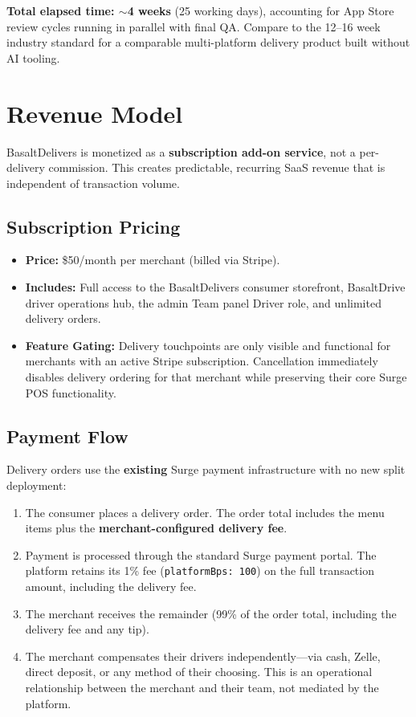 \documentclass[11pt, letterpaper]{article}
\begin{document}
\begin{insightbox}
\textbf{Total elapsed time: $\sim$4 weeks} (25 working days), accounting for App Store review cycles running in parallel with final QA. Compare to the 12--16 week industry standard for a comparable multi-platform delivery product built without AI tooling.
\end{insightbox}

\section{Revenue Model}

BasaltDelivers is monetized as a \textbf{subscription add-on service}, not a per-delivery commission. This creates predictable, recurring SaaS revenue that is independent of transaction volume.

\subsection{Subscription Pricing}
\begin{itemize}
    \item \textbf{Price:} \$50/month per merchant (billed via Stripe).
    \item \textbf{Includes:} Full access to the BasaltDelivers consumer storefront, BasaltDrive driver operations hub, the admin Team panel Driver role, and unlimited delivery orders.
    \item \textbf{Feature Gating:} Delivery touchpoints are only visible and functional for merchants with an active Stripe subscription. Cancellation immediately disables delivery ordering for that merchant while preserving their core Surge POS functionality.
\end{itemize}

\subsection{Payment Flow}
Delivery orders use the \textbf{existing} Surge payment infrastructure with no new split deployment:
\begin{enumerate}
    \item The consumer places a delivery order. The order total includes the menu items plus the \textbf{merchant-configured delivery fee}.
    \item Payment is processed through the standard Surge payment portal. The platform retains its 1\% fee (\texttt{platformBps: 100}) on the full transaction amount, including the delivery fee.
    \item The merchant receives the remainder (99\% of the order total, including the delivery fee and any tip).
    \item The merchant compensates their drivers independently---via cash, Zelle, direct deposit, or any method of their choosing. This is an operational relationship between the merchant and their team, not mediated by the platform.
\end{enumerate}
\end{document}
